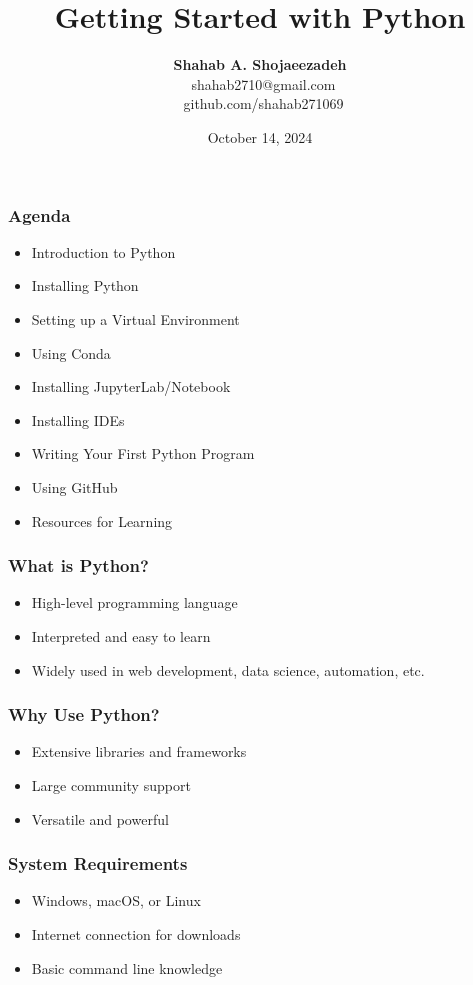 \documentclass{beamer}
\title{\textbf{Getting Started with Python}}
\author{\textbf{Shahab A. Shojaeezadeh} \\ \faEnvelope \, shahab2710@gmail.com \\ \faGithub \, github.com/shahab271069}
\date{October 14, 2024}
\begin{document}
\frame{\titlepage}

\begin{frame}
    \frametitle{Agenda}
    \begin{itemize}
        \item Introduction to Python
        \item Installing Python
        \item Setting up a Virtual Environment
        \item Using Conda
        \item Installing JupyterLab/Notebook
        \item Installing IDEs
        \item Writing Your First Python Program
        \item Using GitHub
        \item Resources for Learning
    \end{itemize}
\end{frame}

\begin{frame}
    \frametitle{What is Python?}
    \begin{itemize}
        \item High-level programming language
        \item Interpreted and easy to learn
        \item Widely used in web development, data science, automation, etc.
    \end{itemize}
\end{frame}

\begin{frame}
    \frametitle{Why Use Python?}
    \begin{itemize}
        \item Extensive libraries and frameworks
        \item Large community support
        \item Versatile and powerful
    \end{itemize}
\end{frame}

\begin{frame}
    \frametitle{System Requirements}
    \begin{itemize}
        \item Windows, macOS, or Linux
        \item Internet connection for downloads
        \item Basic command line knowledge
    \end{itemize}
\end{frame}
\end{document}
